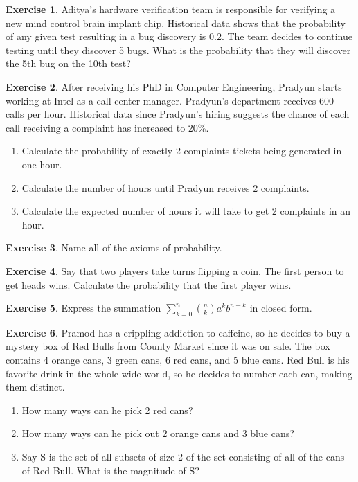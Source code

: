 \documentclass[12pt]{amsart}
\theoremstyle{definition}
\newtheorem{exercise}{Exercise}
\numberwithin{equation}{section}
\theoremstyle{plain}
\begin{document}
\begin{exercise}
    Aditya's hardware verification team is responsible for verifying a new mind control brain implant chip. Historical data shows that the probability of any given test resulting in a bug discovery is 0.2. The team decides to continue testing until they discover 5 bugs. What is the probability that they will discover the 5th bug on the 10th test?%
\end{exercise}

\begin{exercise}
    After receiving his PhD in Computer Engineering, Pradyun starts working at Intel as a call center manager. Pradyun's department receives 600 calls per hour. Historical data since Pradyun's hiring suggests the chance of each call receiving a complaint has increased to 20\%. 
\begin{enumerate}[label=\Alph*.]
    \item Calculate the probability of exactly 2 complaints tickets being generated in one hour. 
    \item Calculate the number of hours until Pradyun receives 2 complaints.
    \item Calculate the expected number of hours it will take to get 2 complaints in an hour.
    \end{enumerate}
\end{exercise}

\begin{exercise}
Name all of the axioms of probability.
\end{exercise}

\begin{exercise}
Say that two players take turns flipping a coin. The first person to get heads wins. Calculate the probability that the first player wins.
\end{exercise}

\begin{exercise}
Express the summation $\sum_{k=0}^{n}\binom{n}{k}a^kb^{n-k}$ in closed form.
\end{exercise}

\begin{exercise}
Pramod has a crippling addiction to caffeine, so he decides to buy a mystery box of Red Bulls from County Market since it was on sale. The box contains 4 orange cans, 3 green cans, 6 red cans, and 5 blue cans. Red Bull is his favorite drink in the whole wide world, so he decides to number each can, making them distinct. 
\begin{enumerate}[label=\Alph*.]

\item How many ways can he pick 2 red cans?
\item How many ways can he pick out 2 orange cans and 3 blue cans?
\item Say S is the set of all subsets of size 2 of the set consisting of all of the cans of Red Bull. What is the magnitude of S?
\end{enumerate}
\end{exercise}
\end{document}
